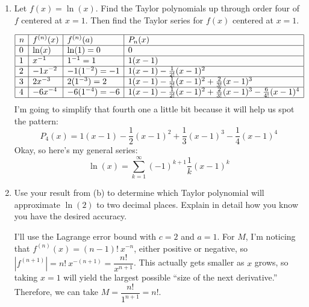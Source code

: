 \documentclass[10pt]{article}
\newenvironment{red}{\color{red}}{\ignorespacesafterend}
\begin{document}
\begin{enumerate}[leftmargin=0pt]
\begin{enumerate}
\begin{red}
    \end{red}
    \item Let $f(x) = \ln(x)$. Find the Taylor polynomials up through order four of $f$ centered at $x=1$. Then find the Taylor series for $f(x)$ centered at $x=1$.
    
    \begin{red}
    \[
    \begin{array}{|l|l|l|l|}
    \hline
    n & f^{(n)}(x) & f^{(n)}(a)      & P_n(x)                                             \\ \hline
    0 & \ln(x)     & \ln(1) = 0      & 0                                                  \\ \hline
    1 & x^{-1}     & 1^{-1} = 1      & 1(x-1)                                             \\ \hline
    2 & -1x^{-2}   & -1(1^{-2}) = -1 & 1(x-1) 
                                       - \frac{1}{2!}(x-1)^2  \\ \hline
    3 & 2x^{-3}    & 2(1^{-3}) = 2   & 1(x-1) 
                                       - \frac{1}{2!}(x-1)^2 
                                       + \frac{2}{3!}(x-1)^3 \\ \hline
    4 & -6x^{-4}   & -6(1^{-4}) = -6 & 1(x-1) 
                                       - \frac{1}{2!}(x-1)^2 
                                       + \frac{2}{3!}(x-1)^3 
                                       - \frac{6}{4!}(x-1)^4 \\ \hline
    \end{array}
    \]
    I'm going to simplify that fourth one a little bit because it will help us spot the pattern:
    \[P_4(x) = 1(x-1) 
               - \frac{1}{2}(x-1)^2 
               + \frac{1}{3}(x-1)^3 
               - \frac{1}{4}(x-1)^4
               \]
    Okay, so here's my general series:
    \[\ln(x) = \sum\limits_{k=1}^\infty (-1)^{k+1} \frac{1}{k} (x-1)^k\]
    \end{red}
    \item Use your result from (b) to determine which Taylor polynomial will approximate $\ln(2)$ to two decimal places. Explain in detail how you know you have the desired accuracy.
    
    \begin{red}
    I'll use the Lagrange error bound with $c=2$ and $a=1$. For $M$, I'm noticing that $f^{(n)}(x) = (n-1)!\ x^{-n}$, either positive or negative, so $|f^{(n+1)}| = n!\  x^{-(n+1)} = \dfrac{n!}{x^{n+1}}$. This actually gets smaller as $x$ grows, so taking $x=1$ will yield the largest possible ``size of the next derivative.'' Therefore, we can take $M = \dfrac{n!}{1^{n+1}} = n!$.
    

\end{red}
\end{enumerate}
\end{enumerate}
\end{document}
